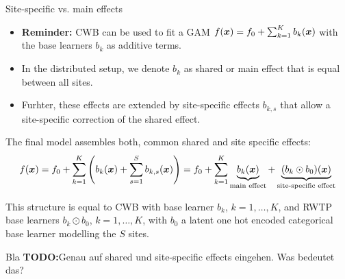 \documentclass[t,10pt]{beamer}
\newcommand{\todo}{{\color{red}\textbf{TODO:}}\hspace{0.1cm}}
\begin{document}
\begin{frame}{Site-specific vs. main effects}
  \begin{itemize}
    \item
      \textbf{Reminder:} CWB can be used to fit a GAM $f(\bm{x}) = f_0 + \sum_{k=1}^K b_k(\bm{x})$ with the base learners $b_k$ as additive terms.
    \item
      In the distributed setup, we denote $b_k$ as shared or main effect that is equal between all sites.

    \item
      Furhter, these effects are extended by site-specific effects $b_{k,s}$ that allow a site-specific correction of the shared effect.
  \end{itemize}

  The final model assembles both, common shared and site specific effects:
  \[f(\bm{x}) = f_0 + \sum_{k=1}^K\left(b_k(\bm{x}) + \sum_{s=1}^S b_{k,s}(\bm{x})\right) = f_0 + \sum_{k=1}^K \underbrace{b_k(\bm{x})}_{\text{main effect}} + \underbrace{(b_k \odot b_0)(\bm{x})}_{\text{site-specific effect}}\]

  This structure is equal to CWB with base learner $b_k$, $k = 1, \dots, K$, and RWTP base learners $b_k \odot b_0$, $k = 1, \dots, K$, with $b_0$ a latent one hot encoded categorical base learner modelling the $S$ sites.
\end{frame}

\begin{frame}{Bla}
  \todo Genau auf shared und site-specific effects eingehen. Was bedeutet das?
\end{frame}

\end{document}
